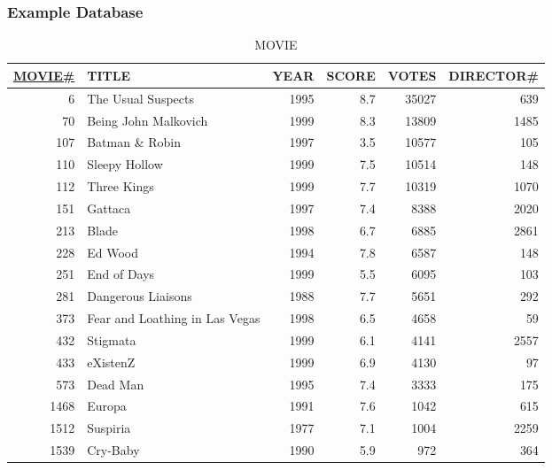 \documentclass[dvipsnames]{beamer}
\theoremstyle{plain}
\begin{document}
\begin{frame}
  \frametitle{Example Database}

  \begin{tiny}
  \begin{table}
    \caption{MOVIE}
    \begin{tabular}{|r|l|r|r|r|r|}\hline
\underline{MOVIE\#} & TITLE           & YEAR & SCORE & VOTES & DIRECTOR\#\\[2pt]\hline\hline
   6 & The Usual Suspects             & 1995 &   8.7 & 35027 &        639\\\hline
  70 & Being John Malkovich           & 1999 &   8.3 & 13809 &       1485\\\hline
 107 & Batman \& Robin                & 1997 &   3.5 & 10577 &        105\\\hline
 110 & Sleepy Hollow                  & 1999 &   7.5 & 10514 &        148\\\hline
 112 & Three Kings                    & 1999 &   7.7 & 10319 &       1070\\\hline
 151 & Gattaca                        & 1997 &   7.4 &  8388 &       2020\\\hline
 213 & Blade                          & 1998 &   6.7 &  6885 &       2861\\\hline
 228 & Ed Wood                        & 1994 &   7.8 &  6587 &        148\\\hline
 251 & End of Days                    & 1999 &   5.5 &  6095 &        103\\\hline
 281 & Dangerous Liaisons             & 1988 &   7.7 &  5651 &        292\\\hline
 373 & Fear and Loathing in Las Vegas & 1998 &   6.5 &  4658 &         59\\\hline
 432 & Stigmata                       & 1999 &   6.1 &  4141 &       2557\\\hline
 433 & eXistenZ                       & 1999 &   6.9 &  4130 &         97\\\hline
 573 & Dead Man                       & 1995 &   7.4 &  3333 &        175\\\hline
1468 & Europa                         & 1991 &   7.6 &  1042 &        615\\\hline
1512 & Suspiria                       & 1977 &   7.1 &  1004 &       2259\\\hline
1539 & Cry-Baby                       & 1990 &   5.9 &   972 &        364\\\hline
    \end{tabular}
  \end{table}
  \end{tiny}
\end{frame}
\end{document}

